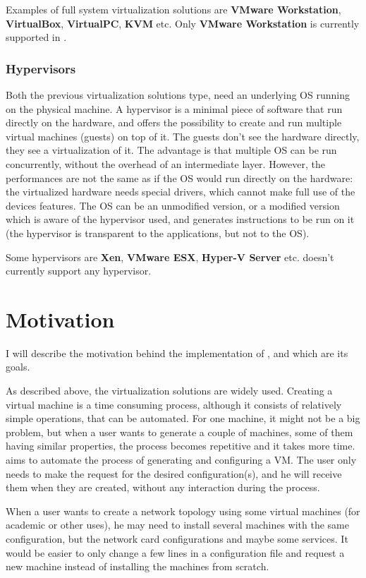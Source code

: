 Examples of full system virtualization solutions are \textbf{VMware
Workstation}, \textbf{VirtualBox}, \textbf{VirtualPC}, \textbf{KVM} etc. Only
\textbf{VMware Workstation} is currently supported in \project.

\subsubsection{Hypervisors}
\label{sub-sub-sec:virt-hypervisors}
Both the previous virtualization solutions type, need an underlying OS running
on the physical machine. A hypervisor is a minimal piece of software that run
directly on the hardware, and offers the possibility to create and run multiple
virtual machines (guests) on top of it. The guests don't see the hardware
directly, they see a virtualization of it. The advantage is that multiple OS
can be run concurrently, without the overhead of an intermediate layer.
However, the performances are not the same as if the OS would run directly on
the hardware: the virtualized hardware needs special drivers, which cannot make
full use of the devices features. The OS can be an unmodified version, or a
modified version which is aware of the hypervisor used, and generates
instructions to be run on it (the hypervisor is transparent to the
applications, but not to the OS).

Some hypervisors are \textbf{Xen}, \textbf{VMware ESX}, \textbf{Hyper-V Server}
etc. \project doesn't currently support any hypervisor.

\section{Motivation}
\label{sec:motivation}
I will describe the motivation behind the implementation of \project, and which
are its goals.

As described above, the virtualization solutions are widely used. Creating a
virtual machine is a time consuming process, although it consists of relatively
simple operations, that can be automated. For one machine, it might not be a
big problem, but when a user wants to generate a couple of machines, some of
them having similar properties, the process becomes repetitive and it takes
more time. \project aims to automate the process of generating and configuring
a VM. The user only needs to make the request for the desired configuration(s),
and he will receive them when they are created, without any interaction during
the process.

When a user wants to create a network topology using some virtual machines (for
academic or other uses), he may need to install several machines with the same
configuration, but the network card configurations and maybe some services. It
would be easier to only change a few lines in a configuration file and request
a new machine instead of installing the machines from scratch.

